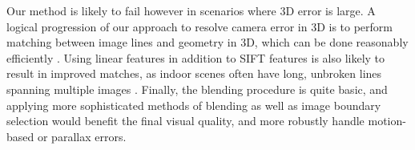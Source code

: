 \documentclass[]{spie}  %
\begin{document}
Our method is likely to fail however in scenarios where 3D error is
large. A logical progression of our approach to resolve camera error
in 3D is to perform matching between image lines and geometry in 3D,
which can be done reasonably efficiently \cite{linebased,
  rectangularstructures}. Using linear features in addition to SIFT
features is also likely to result in improved matches, as indoor
scenes often have long, unbroken lines spanning multiple images
\cite{linearposeestimation}. Finally, the blending procedure is quite
basic, and applying more sophisticated methods of blending as well as
image boundary selection would benefit the final visual quality, and
more robustly handle motion-based or parallax errors.


\end{document}
